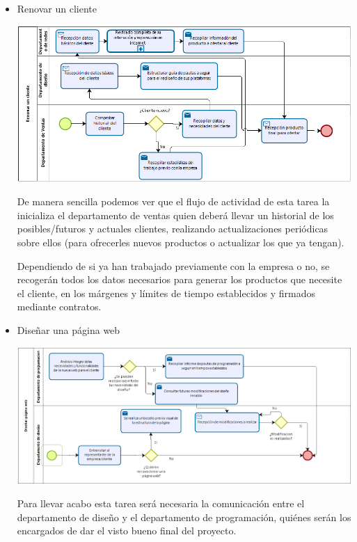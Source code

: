 \documentclass{article}
\begin{document}
\begin{itemize}
\item Renovar un cliente
\begin{center}
\includegraphics[scale=0.5]{images/cliente.png}
\end{center}
De manera sencilla podemos ver que el flujo de actividad de esta tarea la inicializa el departamento de ventas quien deberá llevar un historial de los posibles/futuros y actuales clientes, realizando actualizaciones periódicas sobre ellos (para ofrecerles nuevos productos o actualizar los que ya tengan). 

Dependiendo de si ya han trabajado previamente con la empresa o no, se recogerán todos los datos necesarios para generar los productos que necesite el cliente, en los márgenes y límites de tiempo establecidos y firmados mediante contratos.
\item Diseñar una página web
\begin{center}
\includegraphics[scale=0.5]{images/web.png}
\end{center}
Para llevar acabo esta tarea será necesaria la comunicación entre el departamento de diseño y el departamento de programación, quiénes serán los encargados de dar el visto bueno final del proyecto. 


\end{itemize}
\end{document}
